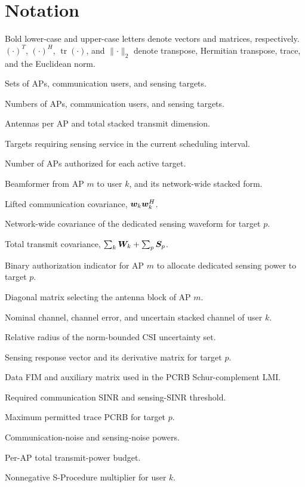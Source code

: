 \chapter*{Notation}\label{notation}

Bold lower-case and upper-case letters denote vectors and matrices,
respectively. $(\cdot)^T$, $(\cdot)^H$, $\operatorname{tr}(\cdot)$, and
$\lVert\cdot\rVert_2$ denote transpose, Hermitian transpose, trace, and the
Euclidean norm.

{\small
\begin{description}
\setlength{\itemsep}{0pt}
\setlength{\parsep}{0pt}
\item[$\mathcal{M},\mathcal{K},\mathcal{P}$] Sets of APs, communication users, and sensing targets.
\item[$M,K,P$] Numbers of APs, communication users, and sensing targets.
\item[$N_t$, $N=MN_t$] Antennas per AP and total stacked transmit dimension.
\item[$\mathcal{P}^{\mathrm{active}}$] Targets requiring sensing service in the current scheduling interval.
\item[$N_{\mathrm{req}}$] Number of APs authorized for each active target.
\item[$\vect{w}_{m,k}$, $\vect{w}_k$] Beamformer from AP $m$ to user $k$, and its network-wide stacked form.
\item[$\mat{W}_k$] Lifted communication covariance, $\bm{w}_k\bm{w}_k^H$.
\item[$\mat{S}_p$] Network-wide covariance of the dedicated sensing waveform for target $p$.
\item[$\mat{R}_X$] Total transmit covariance, $\sum_k\bm{W}_k+\sum_p\bm{S}_p$.
\item[$b_{mp}$] Binary authorization indicator for AP $m$ to allocate dedicated sensing power to target $p$.
\item[$\mat{E}_m$] Diagonal matrix selecting the antenna block of AP $m$.
\item[$\hat{\vect{h}}_k$, $\Delta\vect{h}_k$, $\vect{h}_k$] Nominal channel, channel error, and uncertain stacked channel of user $k$.
\item[$\epsilon_h$] Relative radius of the norm-bounded CSI uncertainty set.
\item[$\vect{g}_p$, $\mat{D}_p$] Sensing response vector and its derivative matrix for target $p$.
\item[$\mat{J}_p^{\mathrm{data}}$, $\mat{M}_p$] Data FIM and auxiliary matrix used in the PCRB Schur-complement LMI.
\item[$\gamma_k$, $\gamma_S^{\mathrm{PoD}}$] Required communication SINR and sensing-SINR threshold.
\item[$\Gamma_{\mathrm{Track},p}$] Maximum permitted trace PCRB for target $p$.
\item[$\sigma_c^2$, $\sigma_s^2$] Communication-noise and sensing-noise powers.
\item[$P_{\max}$] Per-AP total transmit-power budget.
\item[$\mu_k$] Nonnegative S-Procedure multiplier for user $k$.
\end{description}
}
